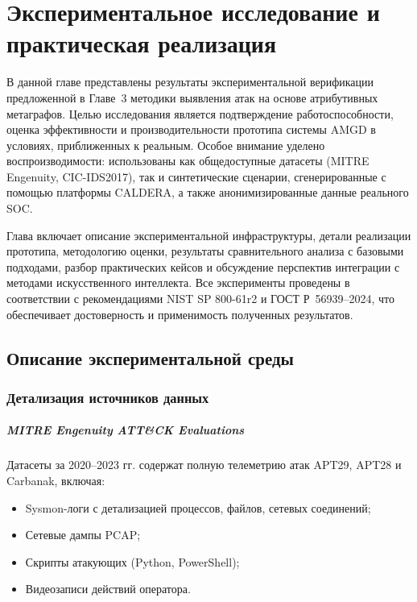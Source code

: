 \documentclass{article}
\begin{document}

\chapter{Экспериментальное исследование и практическая реализация}\label{ch:ch4}

В данной главе представлены результаты экспериментальной верификации предложенной в Главе~3 методики выявления атак на основе атрибутивных метаграфов. Целью исследования является подтверждение работоспособности, оценка эффективности и производительности прототипа системы AMGD в условиях, приближенных к реальным. Особое внимание уделено воспроизводимости: использованы как общедоступные датасеты (MITRE Engenuity, CIC-IDS2017), так и синтетические сценарии, сгенерированные с помощью платформы CALDERA, а также анонимизированные данные реального SOC.

Глава включает описание экспериментальной инфраструктуры, детали реализации прототипа, методологию оценки, результаты сравнительного анализа с базовыми подходами, разбор практических кейсов и обсуждение перспектив интеграции с методами искусственного интеллекта. Все эксперименты проведены в соответствии с рекомендациями NIST SP 800-61r2 и ГОСТ Р~56939–2024, что обеспечивает достоверность и применимость полученных результатов.

\section{Описание экспериментальной среды}\label{sec:ch4/sect1}

\subsection{Детализация источников данных}

\paragraph{MITRE Engenuity ATT\&CK Evaluations}
Датасеты за 2020–2023 гг. содержат полную телеметрию атак APT29, APT28 и Carbanak, включая:

\begin{itemize}
    \item Sysmon-логи с детализацией процессов, файлов, сетевых соединений;
    \item Сетевые дампы PCAP;
    \item Скрипты атакующих (Python, PowerShell);
    \item Видеозаписи действий оператора.
\end{itemize}
\end{document}
